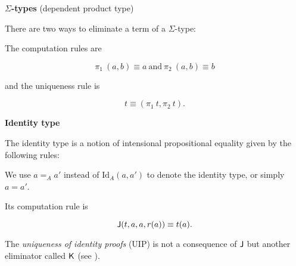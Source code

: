\textbf{$\Sigma$-types} (dependent product type)


\begin{multicols}{2}
\columnbreak
{}
\end{multicols}

There are two ways to eliminate a term of a $\Sigma$-type:

\begin{multicols}{2}
\columnbreak
{}
\end{multicols}

The computation rules are 

$$\pi_1 ~(a,b) \equiv a~ \text{and} ~ \pi_2 ~(a,b) \equiv b$$

and the uniqueness rule is

$$t \equiv (\pi_1 ~t, \pi_2 ~t).$$

\textbf{Identity type}

The identity type is a notion of intensional propositional equality given by the following rules:

\begin{multicols}{2}
\columnbreak
{}
\end{multicols}

We use  $a =_{A} a'$ instead of $\text{Id}_A(a, a')$ to denote the identity type, or simply $a = a'$.


Its computation rule is

$$\operatorname{\mathsf{J}} (t,a,a,r(a)) \equiv t(a).$$

The \emph{uniqueness of identity proofs} (UIP) is not a consequence of $\operatorname{\mathsf{J}}$ but another eliminator called $\operatorname{\mathsf{K}}$ (see ).

